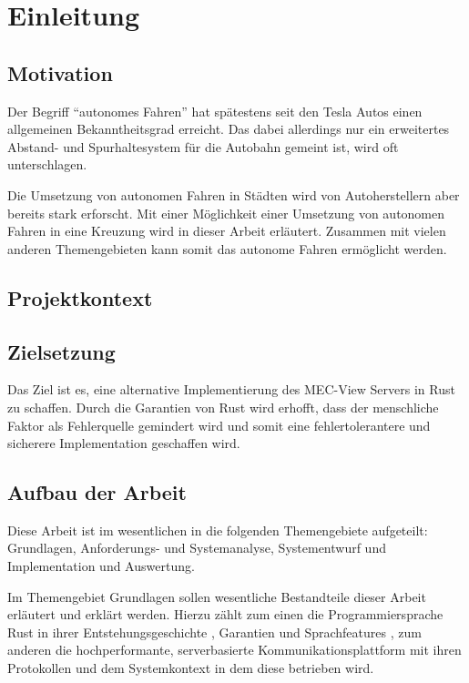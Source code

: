 
\chapter{Einleitung}

\section{Motivation}
Der Begriff \enquote{autonomes Fahren} hat spätestens seit den Tesla Autos einen allgemeinen Bekanntheitsgrad erreicht. Das dabei allerdings nur ein erweitertes Abstand- und Spurhaltesystem
für die Autobahn gemeint ist, wird oft unterschlagen.

Die Umsetzung von autonomen Fahren in Städten wird von Autoherstellern aber bereits stark erforscht.
Mit einer Möglichkeit einer Umsetzung von autonomen Fahren in eine Kreuzung wird in dieser Arbeit erläutert.
Zusammen mit vielen anderen Themengebieten kann somit das autonome Fahren ermöglicht werden.

\section{Projektkontext}

\section{Zielsetzung}

Das Ziel ist es, eine alternative Implementierung des MEC-View Servers in Rust zu schaffen.
Durch die Garantien  von Rust wird erhofft, dass der menschliche Faktor als Fehlerquelle gemindert wird und somit eine fehlertolerantere und sicherere Implementation geschaffen wird.


\section{Aufbau der Arbeit}

Diese Arbeit ist im wesentlichen in die folgenden Themengebiete aufgeteilt: Grundlagen, Anforderungs- und Systemanalyse, Systementwurf und Implementation und Auswertung.

Im Themengebiet Grundlagen sollen wesentliche Bestandteile dieser Arbeit erläutert und erklärt werden.
Hierzu zählt zum einen die Programmiersprache Rust in ihrer Entstehungsgeschichte , Garantien   und Sprachfeatures , zum anderen die hochperformante, serverbasierte Kommunikationsplattform mit ihren Protokollen  und dem Systemkontext in dem diese betrieben wird.

